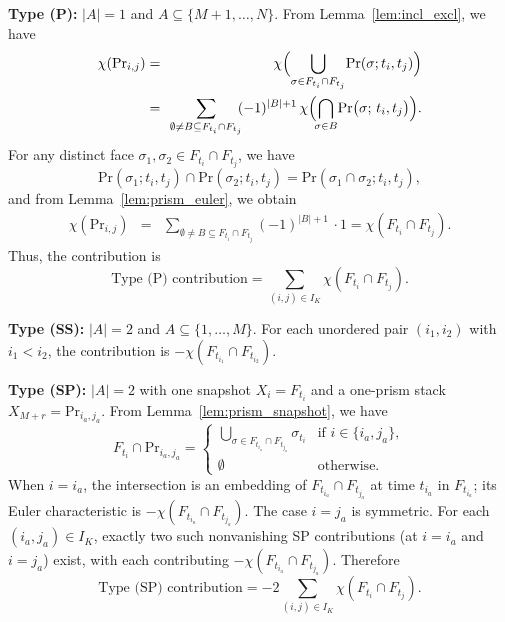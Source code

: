 \documentclass[
    pre,
    twocolumn,
    superscriptaddress,
    showpacs,
    nofootinbib,
    amsmath,
    amssymb,
    floatfix
]{revtex4-2}
\theoremstyle{plain} %
\theoremstyle{definition} %
\begin{document}
\textbf{Type (P):} $|A| = 1$ and $A \subseteq \{M+1, \ldots, N\}$.
From Lemma~\ref{lem:incl_excl}, we have
\begin{eqnarray*}
    \chi(\mathrm{Pr}_{i,j}) &=& \chi \Bigl(\bigcup_{\sigma \in F_{t_i} \cap F_{t_j}}\!\mathrm{Pr}(\sigma; t_i, t_j)\Bigr)\\
    &=& \!\!\sum_{\emptyset \neq B \subseteq F_{t_i} \cap F_{t_j}}\!\!(-1)^{|B|+1}\,\chi\Bigl(\!\bigcap_{\sigma \in B}\!\mathrm{Pr}\bigl(\sigma;\,t_i, t_j\bigr)\Bigr).
\end{eqnarray*}
For any distinct face $\sigma_1, \sigma_2 \in F_{t_i} \cap F_{t_j}$, we have
\begin{equation*}
    \mathrm{Pr}(\sigma_1; t_i, t_j) \cap \mathrm{Pr}(\sigma_2; t_i, t_j) =\mathrm{Pr}(\sigma_1 \cap \sigma_2; t_i, t_j),
\end{equation*}
and from Lemma~\ref{lem:prism_euler}, we obtain
\begin{eqnarray*}
    \chi(\mathrm{Pr}_{i,j}) &=&  \!\!\sum_{\emptyset \neq B \subseteq F_{t_i} \cap F_{t_j}}\!\!(-1)^{|B|+1}\,\cdot 1= \chi(F_{t_i}\cap F_{t_j}).
\end{eqnarray*}
Thus, the contribution is 
\begin{equation*}
    \text{Type (P) contribution} = \sum_{(i,j) \in I_K} \chi(F_{t_i}\cap F_{t_j}).
\end{equation*}


\textbf{Type (SS):} $|A| = 2$ and $A \subseteq \{1, \ldots, M\}$.
For each unordered pair $(i_1, i_2)$ with $i_1 < i_2$, the
contribution is $-\chi(F_{t_{i_1}} \cap F_{t_{i_2}})$.

\textbf{Type (SP):} $|A| = 2$ with one snapshot $X_i = F_{t_i}$ and
a one-prism stack $X_{M+r} = \mathrm{Pr}_{i_a, j_a}$.
From Lemma~\ref{lem:prism_snapshot}, we have
\[
F_{t_i} \cap \mathrm{Pr}_{i_a, j_a}
= \begin{cases}
    \bigcup_{\sigma \in F_{t_{i_a}} \cap F_{t_{j_a}}} \sigma_{t_i}
    & \text{if } i \in \{i_a, j_a\},\\
    \emptyset & \text{otherwise.}
\end{cases}
\]
When $i = i_a$, the intersection is an embedding of
$F_{t_{i_a}} \cap F_{t_{j_a}}$ at time $t_{i_a}$ in $F_{t_{i_a}}$;
its Euler characteristic is $-\chi(F_{t_{i_a}} \cap F_{t_{j_a}})$.
The case $i = j_a$ is symmetric.
For each $(i_a, j_a) \in I_K$, exactly two such nonvanishing
SP contributions (at $i = i_a$ and $i = j_a$) exist, with each contributing
$-\chi(F_{t_{i_a}} \cap F_{t_{j_a}})$.
Therefore
\begin{equation*}
    \text{Type (SP) contribution}
    = -2 \sum_{(i,j) \in I_K} \chi(F_{t_i} \cap F_{t_j}).
\end{equation*}
\end{document}
